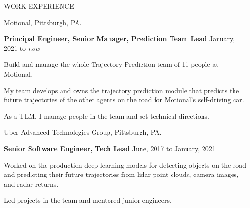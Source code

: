 \documentclass{resume} %
\begin{document}
\begin{rSection}{WORK EXPERIENCE}

\begin{rSubsection}{\hspace{-1em} Motional, Pittsburgh, PA.}{}{}{}
\item[] \hspace{-2em} {\bf Principal Engineer, Senior Manager, Prediction Team Lead} \hfill January, 2021 to \emph{now}
\item Build and manage the whole Trajectory Prediction team of 11 people at Motional.
\item My team develops and owns the trajectory prediction module that predicts the future trajectories of the other agents on the road for Motional's self-driving car.
\item As a TLM, I manage people in the team and set technical directions.
\end{rSubsection}

\begin{rSubsection}{\hspace{-1em} Uber Advanced Technologies Group, Pittsburgh, PA.}{}{}{}
\item[] \hspace{-2em} {\bf Senior Software Engineer, Tech Lead} \hfill June, 2017 to January, 2021
\item Worked on the production deep learning models for detecting objects on the road and predicting their future trajectories from lidar point clouds, camera images, and radar returns.
\item Led projects in the team and mentored junior engineers.
\end{rSubsection}
\end{rSection}
\end{document}
